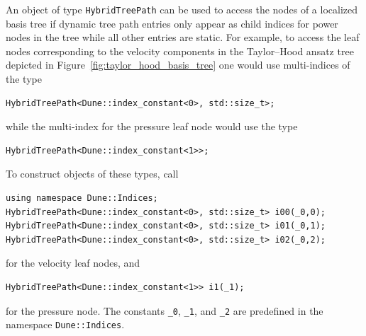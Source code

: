 \documentclass[a4paper,10pt,headings=normal,bibliography=totoc]{scrartcl}
\newcommand{\cpp}[1]{\lstinline[basicstyle=\ttfamily]!#1!}
\begin{document}
An object of type \cpp{HybridTreePath} can be used to access the nodes of a
localized basis tree if dynamic tree path entries only appear as child indices
for power nodes in the tree while all other entries are static.
For example, to access the leaf nodes corresponding
to the velocity components in the Taylor--Hood ansatz tree depicted
in Figure~\ref{fig:taylor_hood_basis_tree} one would use multi-indices
of the type
\begin{lstlisting}[style=Example]
HybridTreePath<Dune::index_constant<0>, std::size_t>;
\end{lstlisting}
while the multi-index for the pressure leaf node would use the type
\begin{lstlisting}[style=Example]
HybridTreePath<Dune::index_constant<1>>;
\end{lstlisting}
To construct objects of these types, call
\begin{lstlisting}[style=Example]
using namespace Dune::Indices;
HybridTreePath<Dune::index_constant<0>, std::size_t> i00(_0,0);
HybridTreePath<Dune::index_constant<0>, std::size_t> i01(_0,1);
HybridTreePath<Dune::index_constant<0>, std::size_t> i02(_0,2);
\end{lstlisting}
for the velocity leaf nodes, and
\begin{lstlisting}[style=Example]
HybridTreePath<Dune::index_constant<1>> i1(_1);
\end{lstlisting}
for the pressure node.  The constants \cpp{_0}, \cpp{_1}, and \cpp{_2}
are predefined in the namespace \cpp{Dune::Indices}.
\end{document}
